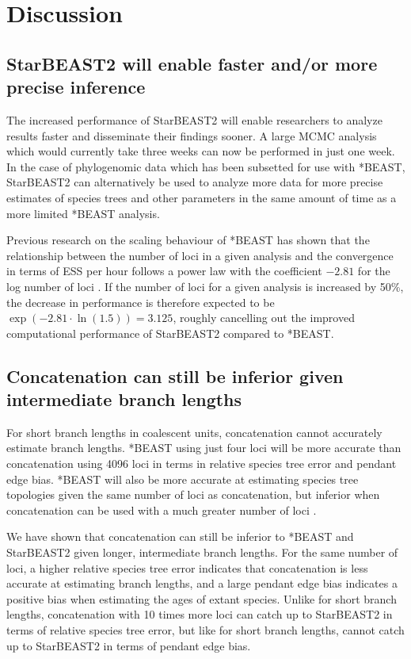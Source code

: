 \documentclass[12pt]{article}
\begin{document}
\clearpage

\section*{Discussion}

\subsection*{StarBEAST2 will enable faster and/or more precise inference}

The increased performance of StarBEAST2 will enable researchers to analyze
results faster and disseminate their findings sooner. A large MCMC analysis
which would currently take three weeks can now be performed in just one week. In
the case of phylogenomic data which has been subsetted for use with *BEAST,
StarBEAST2 can alternatively be used to analyze more data for more precise
estimates of species trees and other parameters in the same amount of time as a
more limited *BEAST analysis.

Previous research on the scaling behaviour of *BEAST has shown that the
relationship between the number of loci in a given analysis and the convergence
in terms of ESS per hour follows a power law with the coefficient $-2.81$ for the
log number of loci \citep{Ogilvie01052016}. If the number of loci for a given
analysis is increased by 50\%, the decrease in performance is therefore expected
to be $\exp(-2.81 \cdot \ln(1.5)) = 3.125$, roughly cancelling out the improved
computational performance of StarBEAST2 compared to *BEAST.

\subsection*{Concatenation can still be inferior given intermediate branch lengths}

For short branch lengths in coalescent units, concatenation cannot accurately
estimate branch lengths. *BEAST using just four loci will be more accurate than
concatenation using 4096 loci in terms in relative species tree error and
pendant edge bias. *BEAST will also be more accurate at estimating species tree
topologies given the same number of loci as concatenation, but inferior when
concatenation can be used with a much greater number of loci
\citep{Ogilvie01052016}.

We have shown that concatenation can still be inferior to *BEAST and StarBEAST2
given longer, intermediate branch lengths. For the same number of loci, a higher
relative species tree error indicates that concatenation is less accurate at
estimating branch lengths, and a large pendant edge bias indicates a positive bias when
estimating the ages of extant species. Unlike for short branch lengths,
concatenation with 10 times more loci can catch up to StarBEAST2 in terms of relative
species tree error, but like for short branch lengths, cannot catch up to StarBEAST2
in terms of pendant edge bias.
\end{document}
